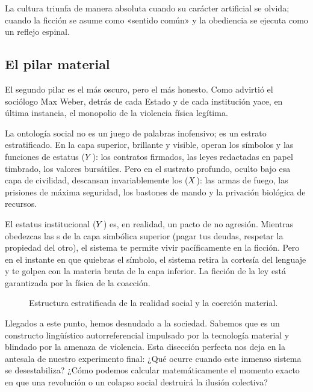 La cultura triunfa de manera absoluta cuando su carácter artificial se olvida; cuando la ficción se asume como «sentido común» y la obediencia se ejecuta como un reflejo espinal.

\subsection{El pilar material}

El segundo pilar es el más oscuro, pero el más honesto. Como advirtió el sociólogo Max Weber, detrás de cada Estado y de cada institución yace, en última instancia, el monopolio de la violencia física legítima.

La ontología social no es un juego de palabras inofensivo; es un estrato estratificado. En la capa superior, brillante y visible, operan los símbolos y las funciones de estatus ($Y$): los contratos firmados, las leyes redactadas en papel timbrado, los valores bursátiles. Pero en el sustrato profundo, oculto bajo esa capa de civilidad, descansan invariablemente los \HechosBrutos{} ($X$): las armas de fuego, las prisiones de máxima seguridad, los bastones de mando y la privación biológica de recursos.

\begin{argumento}
El estatus institucional ($Y$) es, en realidad, un pacto de no agresión. Mientras obedezcas las \ReglaConstitutiva{}s de la capa simbólica superior (pagar tus deudas, respetar la propiedad del otro), el sistema te permite vivir pacíficamente en la ficción. Pero en el instante en que quiebras el símbolo, el sistema retira la cortesía del lenguaje y te golpea con la materia bruta de la capa inferior. La ficción de la ley está garantizada por la física de la coacción.
\end{argumento}

\begin{figure}[htbp]
    \centering
    
    \caption{Estructura estratificada de la realidad social y la coerción material.}
    \label{fig:sandwich_ontologico}
\end{figure}

Llegados a este punto, hemos desnudado a la sociedad. Sabemos que es un constructo lingüístico autorreferencial impulsado por la tecnología material y blindado por la amenaza de violencia. Esta disección perfecta nos deja en la antesala de nuestro experimento final: ¿Qué ocurre cuando este inmenso sistema se desestabiliza? ¿Cómo podemos calcular matemáticamente el momento exacto en que una revolución o un colapso social destruirá la ilusión colectiva?

